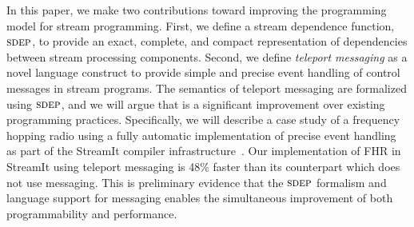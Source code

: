 In  this  paper,  we  make  two contributions  toward  improving  the
programming model  for stream programming.  First, we  define a stream
dependence function, $\textsc{sdep}$,
to  provide   an  exact,  complete,  and   compact  representation  of
dependencies between stream processing components.
Second,  we define  {\it  teleport messaging}  as a  novel language
construct  to provide  simple  and precise  event  handling of control
messages in stream
programs.
The semantics of teleport  messaging are formalized using $\textsc{sdep}$, and
we  will  argue  that  is  a  significant  improvement  over  existing
programming practices. Specifically, we  will describe a case study of
a frequency  hopping radio using  a fully automatic  implementation of
precise   event   handling   as   part  of   the   StreamIt   compiler
infrastructure~\cite{streamit-asplos,  streamitcc}. Our implementation
of FHR  in StreamIt using teleport  messaging is 48\%  faster than its
counterpart which does not use messaging. This is preliminary evidence
that
the $\textsc{sdep}$  formalism and language support for  messaging enables the
simultaneous improvement of both programmability and performance.

